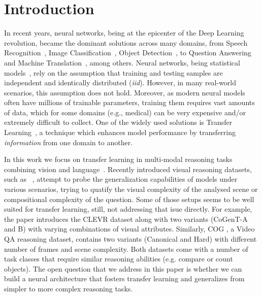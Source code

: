 \section{Introduction}
In recent years, neural networks, being at the epicenter of the Deep Learning~\cite{lecun2015deep} revolution, became the dominant solutions across many domains, from Speech Recognition~\cite{graves2013speech}, Image Classification~\cite{krizhevsky2012imagenet}, Object Detection~\cite{redmon2016you}, to Question Answering~\cite{weston2014memory} and Machine Translation~\cite{bahdanau2014neural}, among others.
Neural networks, being statistical models~\cite{ripley1993statistical,warner1996understanding}, rely on the assumption that training and testing samples are independent and identically distributed (\textit{iid}).
However, in many real-world scenarios, this assumption does not hold. Moreover, as modern neural models often have millions of trainable parameters, training them requires vast amounts of data, which for some domains (e.g., medical) can be very expensive and/or extremely difficult to collect.
One of the widely used solutions is Transfer Learning~\cite{pan2009survey,weiss2016survey}, a technique which enhances model performance by transferring \emph{information} from one domain to another.


In this work we focus on transfer learning in multi-modal reasoning tasks combining vision and language~\cite{mogadala2019trends}. Recently introduced visual reasoning datasets, such as ~\cite{johnson2017clevr,yang2018dataset,song2018explore}, attempt to probe the generalization capabilities of models under various scenarios, trying to quatify the visual complexity of the analysed scene or compositional complexity of the question.
Some of those setups seems to be well suited for transfer learning, still, not addressing that isue directly.
For example, the \cite{johnson2017clevr} paper introduces the CLEVR dataset along with two variants (CoGenT-A and B) with varying combinations of visual attributes.
Similarly, COG \cite{yang2018dataset}, a Video QA reasoning dataset, contains two variants (Canonical and Hard) with different number of frames and scene complexity.
Both datasets come with a number of task classes that require similar reasoning abilities (e.g. compare or count objects).
The open question that we address in this paper is whether we can build a neural architecture that fosters transfer learning and generalizes from simpler to more complex reasoning tasks.

